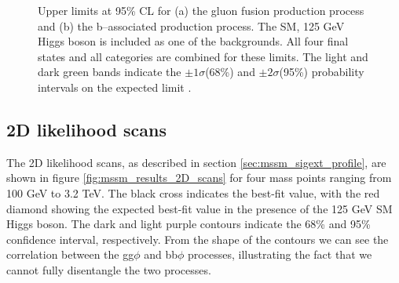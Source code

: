 \begin{figure}[h!]
\begin{center}
\end{center}
\caption[Upper limits at 95\% CL for the gluon fusion and b-associated production processes, with the 125 GeV Higgs boson included as one of the backgrounds.]{Upper limits at 95\% CL for (a) the gluon fusion production
process and (b) the b--associated production process. The SM, 125 GeV Higgs boson
is included as one of the backgrounds. All four final states and 
all categories are combined for these limits. The light and dark green bands indicate
the $\pm 1\sigma$(68\%) and $\pm 2\sigma$(95\%) probability intervals on the expected limit \cite{CMS-PAS-HIG-16-037-addit}.}
\label{fig:mssm_results_greenband}
\end{figure}


\subsection{2D likelihood scans}
\label{sec:mssm_results_2D}
The 2D likelihood scans, as described in section \ref{sec:mssm_sigext_profile},
are shown in figure \ref{fig:mssm_results_2D_scans}
for four mass points ranging from 100 GeV to 3.2 TeV. The black cross indicates the best-fit value, with the red diamond showing the expected
best-fit value in the presence of the 125 GeV SM Higgs boson. The dark and light purple contours
indicate the 68\% and 95\% confidence interval, respectively.  From the shape of the contours
we can see the correlation between the gg$\phi$ and bb$\phi$ processes, illustrating
the fact that we cannot fully disentangle the two processes.

